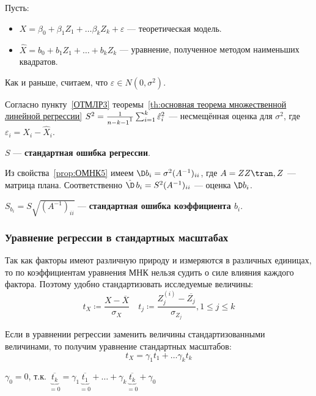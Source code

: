 Пусть:
\begin{itemize}
    \item \(X = \beta_0 + \beta_1 Z_1 + \dots \beta_k Z_k + \varepsilon\) --- теоретическая модель.
    \item \(\hat{X} = b_0 + b_1 Z_1 + \dots + b_k Z_k\) --- уравнение, полученное методом наименьших квадратов.
\end{itemize}

Как и раньше, считаем, что \(\varepsilon \in N(0, \sigma^2)\).

Согласно пункту~\ref{ОТМЛР3} теоремы~\ref{th:основная теорема множественной линейной регрессии} \(S^2 = \frac{1}{n - k - 1\footnotemark} \sum_{i=1}^{k} \hat{\varepsilon}_i^2\) --- несмещённая оценка для \(\sigma^2\), где \(\varepsilon_i = X_i - \hat{X}_i\).

\begin{definition}
    \(S\) --- \textbf{стандартная ошибка регрессии}.
\end{definition}

Из свойства~\ref{prop:ОМНК5} имеем \(\D b_i = \sigma^2 (A^{-1})_{ii}\), где \(A = ZZ\tran, Z\) --- матрица плана. Соответственно \(\hat{\D}\,b_i = S^2 (A^{-1})_{ii}\) --- оценка \(\D b_i\).

\(S_{b_i} = S\sqrt{(A^{-1})_{ii}}\) --- \textbf{стандартная ошибка коэффициента \(b_i\)}.

\subsubsection{Уравнение регрессии в стандартных масштабах}

Так как факторы имеют различную природу и измеряются в различных единицах, то по коэффициентам уравнения МНК нельзя судить о силе влияния каждого фактора. Поэтому удобно стандартизовать исследуемые величины:
\[t_X \coloneqq \frac{X - \overline{X}}{\sigma_X} \quad t_j \coloneqq \frac{Z_{j}^{(i)} - \overline{Z_j}}{\sigma_{Z_j}}, 1 \leq j \leq k\]

Если в уравнении регрессии заменить величины стандартизованными величинами, то получим уравнение стандартных масштабов:
\[t_X = \gamma_1 t_1 + \dots \gamma_k t_k\]
\begin{remark}
    \(\gamma_0 = 0\), т.к. \(\underbrace{\overline{t_k}}_{= 0} = \gamma_1 \underbrace{\overline{t_1}}_{= 0} + \dots + \gamma_k \underbrace{\overline{t_k}}_{= 0} + \gamma_0\)
\end{remark}

